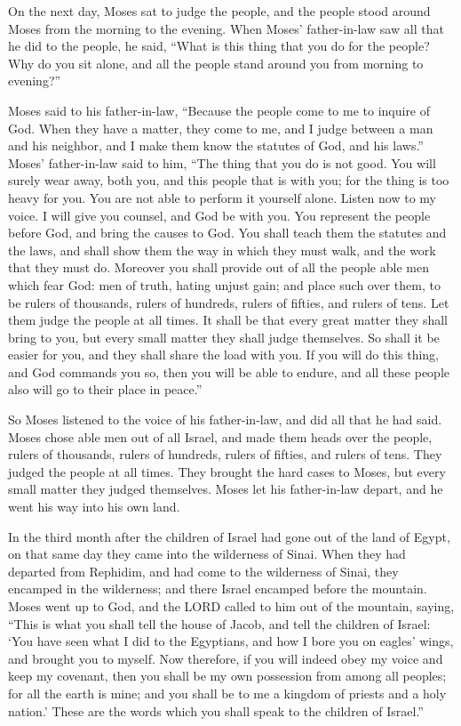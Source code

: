 \myverse{}On the next day, Moses sat to judge the people, and the people
stood around Moses from the morning to the evening.
\myverse{}When Moses’ father-in-law saw all that he did to the people, he said, “What
is this thing that you do for the people? Why do you sit alone, and all the people stand around you from
morning to evening?”


\myverse{}Moses said to his father-in-law, “Because the people come to
me to inquire of God.
\myverse{}When they have a matter, they come to me, and I judge between a man and his
neighbor, and I make them know the statutes of God, and his laws.”
\myverse{}Moses’ father-in-law said to him, “The thing that you do is not good.
\myverse{}You will surely wear away, both you, and this people that is with you; for
the thing is too heavy for you. You are not able to perform it yourself alone.
\myverse{}Listen now to my voice. I will give you counsel, and God be with you. You
represent the people before God, and bring the causes to God.
\myverse{}You shall teach them the statutes and the laws, and shall show them the way
in which they must walk, and the work that they must do.
\myverse{}Moreover you shall provide out of all the people able men which fear God:
men of truth, hating unjust gain; and place such over them, to be rulers of thousands, rulers of hundreds,
rulers of fifties, and rulers of tens.
\myverse{}Let them judge the people at all times. It shall be that every great matter
they shall bring to you, but every small matter they shall judge themselves. So shall it be easier for
you, and they shall share the load with you.
\myverse{}If you will do this thing, and God commands you so, then you will be able
to endure, and all these people also will go to their place in peace.”


\myverse{}So Moses listened to the voice of his father-in-law, and did
all that he had said.
\myverse{}Moses chose able men out of all Israel, and made them heads over the people,
rulers of thousands, rulers of hundreds, rulers of fifties, and rulers of tens.
\myverse{}They judged the people at all times. They brought the hard cases to Moses,
but every small matter they judged themselves.
\myverse{}Moses let his father-in-law depart, and he went his way into his own land.


\mychapter{} \myverse*{}In the third month after the children of Israel had gone out of
the land of Egypt, on that same day they came into the wilderness of Sinai.
\myverse{}When they had departed from Rephidim, and had come to the wilderness of Sinai,
they encamped in the wilderness; and there Israel encamped before the mountain.
\myverse{}Moses went up to God, and the LORD called to him out of the mountain, saying,
“This is what you shall tell the house of Jacob, and tell the children of Israel:
\myverse{}‘You have seen what I did to the Egyptians, and how I bore you on eagles’ wings,
and brought you to myself.
\myverse{}Now therefore, if you will indeed obey my voice and keep my covenant, then
you shall be my own possession from among all peoples; for all the earth is mine;
\myverse{}and you shall be to me a kingdom of priests and a holy nation.’ These are the
words which you shall speak to the children of Israel.”


